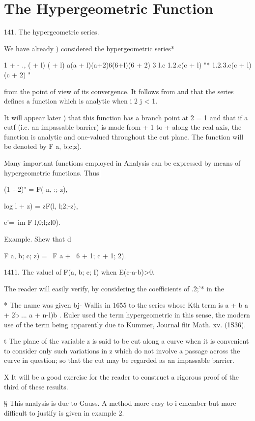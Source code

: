 \chapter{The Hypergeometric Function} 

141. The hypergeometric series.

We have already ) considered the hypergeometric series*

1 + - ., ( + l) ( + l) a(a + l)(a+2)6(6+l)(6 + 2) 3 l.c 1.2.c(c + l)
"* 1.2.3.c(c + l)(c + 2) " 

from the point of view of its convergence. It follows from and that the series defines a function which is analytic when i 2 j
< 1.

It will appear later ) that this function has a branch point
at 2 = 1 and that if a cutf (i.e. an impassable barrier) is made from
+ 1 to + along the real axis, the function is analytic and one-valued
throughout the cut plane. The function will be denoted by F a, b;c;z).

Many important functions employed in Analysis can be expressed by
means of hypergeometric functions. Thus|

(1 +2)" = F(-n, :;-z),

log l + z) = zF(l, l;2;-z),

e'=\ im F l,0;l;zl0).

Example. Shew that d

F a, b; c; z) = ~F a + \, 6 + 1; c + 1; 2).

1411. The valuel of F(a, b; c; I) when E(c-a-b)>0.

The reader will easily verify, by considering the coefficients of
.2;'* in the

* The name was given bj- Wallis in 1655 to the series whose Kth term
is a + b a + 2b ... a + n-l)b . Euler used the term hypergeometric in
this sense, the modern use of the term being apparently due to Kummer,
Journal fiir Math. xv. (1S36).

t The plane of the variable z is said to be cut along a curve when it
is convenient to consider only such variations in z which do not
involve a passage across the curve in question; so that the cut may
be regarded as an impassable barrier.

X It will be a good exercise for the reader to construct a rigorous
proof of the third of these results.

§ This analysis is due to Gauss. A method more easy to i-emember but
more difficult to justify is given in example 2.

